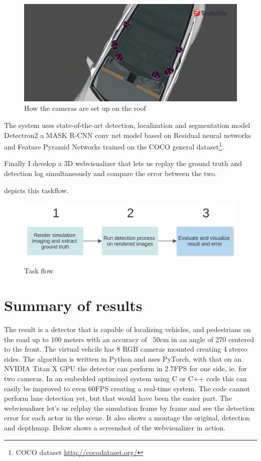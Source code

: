 \begin{figure}[!ht]
    \centering
    \includegraphics[width=150mm, keepaspectratio]{figures/3dmodel2.png}
    \caption{How the cameras are set up on the roof}
    \label{fig:3dmodel2}
\end{figure}

The system uses state-of-the-art detection, localization and segmentation model
Detectron2 \cite{wu2019detectron2} a MASK R-CNN conv net model based on Residual
neural networks and Feature Pyramid Networks trained on the COCO general
dataset\footnote{COCO dataset \url{http://cocodataset.org/}}.

Finally I develop a 3D webvisualizer that lets us replay the ground truth and
detection log simultaneously and compare the error between the two.

 depicts this taskflow.

\begin{figure}[!ht]
    \centering
    \includegraphics[width=150mm, keepaspectratio]{figures/flowchart.png}
    \caption{Task flow}
    \label{fig:flow}
\end{figure}

\section{Summary of results}

The result is a detector that is capable of localizing vehicles, and pedestrians
on the road up to 100 meters with an accuracy of ~50cm in an angle of 270\degree
centered to the front. The virtual vehcile has 8 RGB cameras mounted creating 4
stereo sides. The algorithm is written in Python and uses PyTorch, with that on
an NVIDIA Titan X GPU the detector can perform in 2.7FPS for one side, ie. for
two cameras. In an embedded optimized system using C or C++ code this can easily
be improved to even 60FPS creating a real-time system. The code cannot perform
lane detection yet, but that would have been the easier part. The webvisualizer
let's us relplay the simulation frame by frame and see the detection error for
each actor in the scene. It also shows a montage the original, detection and
depthmap. Below  shows a screenshot of the webvisualizer
in action.

